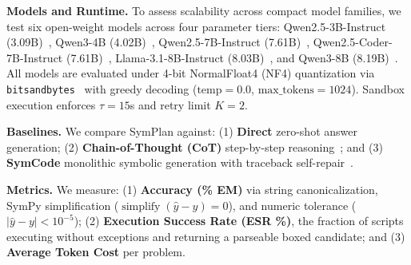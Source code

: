 \documentclass[conference,a4paper]{IEEEtran}
\begin{document}
\textbf{Models and Runtime.} To assess scalability across compact model families, we test six open-weight models across four parameter tiers:
Qwen2.5-3B-Instruct (3.09B)~\cite{qwen2024qwen25},
Qwen3-4B (4.02B)~\cite{qwen2024qwen25},
Qwen2.5-7B-Instruct (7.61B)~\cite{qwen2024qwen25},
Qwen2.5-Coder-7B-Instruct (7.61B)~\cite{hui2024qwen25coder},
Llama-3.1-8B-Instruct (8.03B)~\cite{dubey2024llama3}, and
Qwen3-8B (8.19B)~\cite{qwen2024qwen25}.
All models are evaluated under 4-bit NormalFloat4 (NF4) quantization via \texttt{bitsandbytes}~\cite{dettmers2023qlora} with greedy decoding ($\text{temp}=0.0$, $\text{max\_tokens}=1024$). Sandbox execution enforces $\tau=15$s and retry limit $K=2$.

\textbf{Baselines.} We compare SymPlan against: (1) \textbf{Direct} zero-shot answer generation; (2) \textbf{Chain-of-Thought (CoT)} step-by-step reasoning~\cite{wei2022cot}; and (3) \textbf{SymCode} monolithic symbolic generation with traceback self-repair~\cite{nezhad2025symcode}.

\textbf{Metrics.} We measure: (1) \textbf{Accuracy (\% EM)} via string canonicalization, SymPy simplification ($\operatorname{simplify}(\hat{y}-y)=0$), and numeric tolerance ($|\hat{y}-y|<10^{-5}$); (2) \textbf{Execution Success Rate (ESR \%)}, the fraction of scripts executing without exceptions and returning a parseable boxed candidate; and (3) \textbf{Average Token Cost} per problem.

\begin{table}[t]
\centering
\caption{Cross-model answer accuracy (\%) on the full MATH-500 benchmark across six compact models (3B--8B). Best accuracy per model is in \textbf{bold}.}
\label{tab:mainresults}
\end{table}
\end{document}
